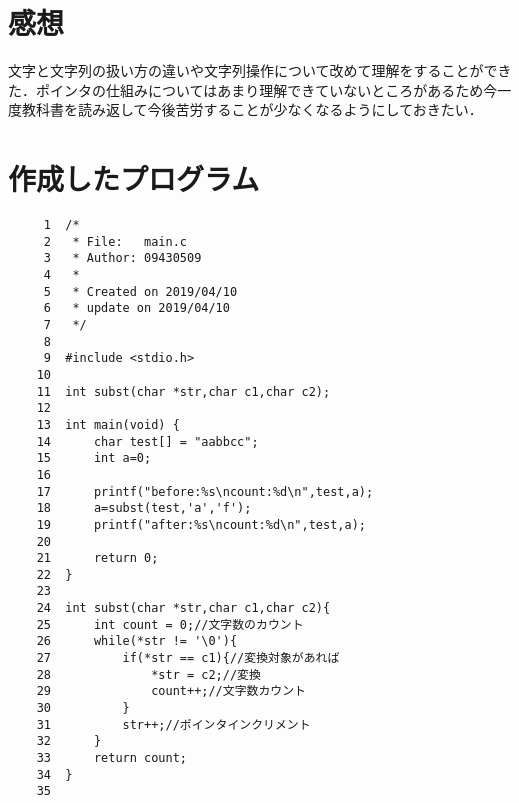 \documentclass[a4j,11pt]{jarticle}
\begin{document}



\section{感想}
文字と文字列の扱い方の違いや文字列操作について改めて理解をすることができた．ポインタの仕組みについてはあまり理解できていないところがあるため今一度教科書を読み返して今後苦労することが少なくなるようにしておきたい．

\section{作成したプログラム} \label{sec:sourcecode}
{\fontsize{10pt}{11pt} \selectfont
\begin{verbatim}
     1	/* 
     2	 * File:   main.c
     3	 * Author: 09430509
     4	 *
     5	 * Created on 2019/04/10
     6	 * update on 2019/04/10
     7	 */
     8	
     9	#include <stdio.h>
    10	
    11	int subst(char *str,char c1,char c2);
    12	
    13	int main(void) {
    14	    char test[] = "aabbcc";
    15	    int a=0;
    16	    
    17	    printf("before:%s\ncount:%d\n",test,a);
    18	    a=subst(test,'a','f');
    19	    printf("after:%s\ncount:%d\n",test,a);
    20	    
    21	    return 0;
    22	}
    23	
    24	int subst(char *str,char c1,char c2){
    25	    int count = 0;//文字数のカウント
    26	    while(*str != '\0'){
    27	        if(*str == c1){//変換対象があれば
    28	            *str = c2;//変換
    29	            count++;//文字数カウント
    30	        }
    31	        str++;//ポインタインクリメント
    32	    }
    33	    return count;
    34	}
    35	

\end{verbatim}
}  %
\end{document}
